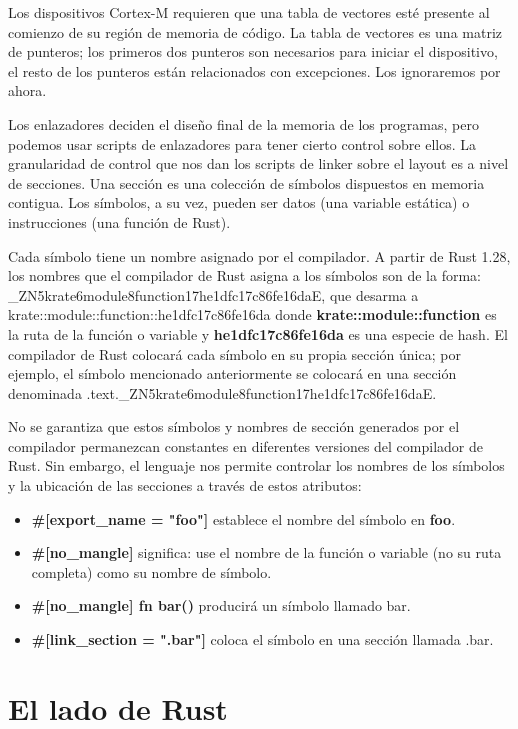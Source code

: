 Los dispositivos Cortex-M requieren que una tabla de vectores esté presente al comienzo de su región de memoria de código. La tabla de vectores es una matriz de punteros; los primeros dos punteros son necesarios para iniciar el dispositivo, el resto de los punteros están relacionados con excepciones. Los ignoraremos por ahora.

Los enlazadores deciden el diseño final de la memoria de los programas, pero podemos usar scripts de enlazadores para tener cierto control sobre ellos. La granularidad de control que nos dan los scripts de linker sobre el layout es a nivel de secciones. Una sección es una colección de símbolos dispuestos en memoria contigua. Los símbolos, a su vez, pueden ser datos (una variable estática) o instrucciones (una función de Rust).

Cada símbolo tiene un nombre asignado por el compilador. A partir de Rust 1.28, los nombres que el compilador de Rust asigna a los símbolos son de la forma: \_ZN5krate6module8function17he1dfc17c86fe16daE, que desarma a krate::module::function::he1dfc17c86fe16da donde \textbf{krate::module::function} es la ruta de la función o variable y \textbf{he1dfc17c86fe16da} es una especie de hash. El compilador de Rust colocará cada símbolo en su propia sección única; por ejemplo, el símbolo mencionado anteriormente se colocará en una sección denominada .text.\_ZN5krate6module8function17he1dfc17c86fe16daE.

No se garantiza que estos símbolos y nombres de sección generados por el compilador permanezcan constantes en diferentes versiones del compilador de Rust. Sin embargo, el lenguaje nos permite controlar los nombres de los símbolos y la ubicación de las secciones a través de estos atributos:

\begin{itemize}
	\item \textbf{\#[export\_name = "foo"]} establece el nombre del símbolo en \textbf{foo}.
	\item \textbf{\#[no\_mangle]} significa: use el nombre de la función o variable (no su ruta completa) como su nombre de símbolo.
	\item \textbf{\#[no\_mangle] fn bar()} producirá un símbolo llamado bar.
	\item \textbf{\#[link\_section = ".bar"]} coloca el símbolo en una sección llamada .bar.
\end{itemize}

\section{El lado de Rust}

